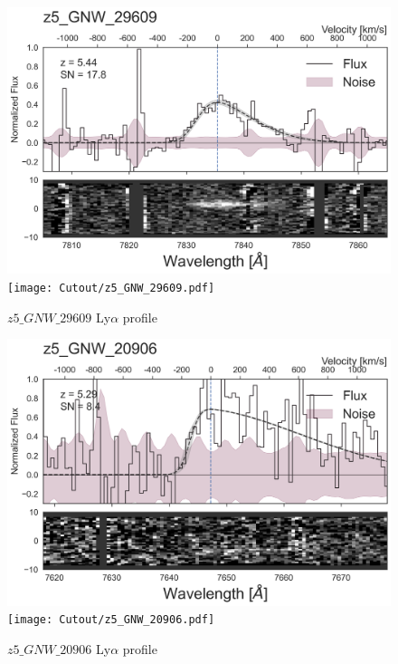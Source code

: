 \documentclass[12pt,english]{article}
\begin{document}
\clearpage
\begin{figure}
\begin{center}\includegraphics[width=12cm, trim=0.1cm 0cm 0cm -1cm]{LyaProfiles/z5_GNW_29609.png}
\texttt{[image: Cutout/z5\_GNW\_29609.pdf]}
\caption{$z5\_GNW\_29609$ Ly$\alpha$ profile}
\end{center}
\end{figure}
\clearpage
\begin{figure}
\begin{center}\includegraphics[width=12cm, trim=0.1cm 0cm 0cm -1cm]{LyaProfiles/z5_GNW_20906.png}
\texttt{[image: Cutout/z5\_GNW\_20906.pdf]}
\caption{$z5\_GNW\_20906$ Ly$\alpha$ profile}
\end{center}
\end{figure}
\clearpage
\end{document}
